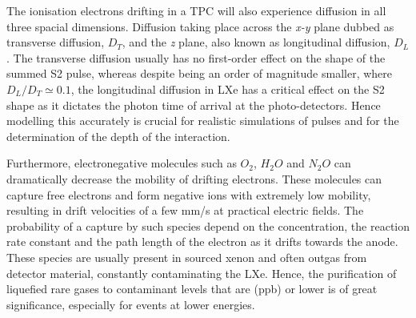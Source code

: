 The ionisation electrons drifting in a TPC will also experience diffusion in all three spacial dimensions. Diffusion taking place across the \textit{x-y} plane dubbed as transverse diffusion, $D_{T}$, and the \textit{z} plane, also known as longitudinal diffusion, $D_{L}$. The transverse diffusion usually has no first-order effect on the shape of the summed S2 pulse, whereas despite being an order of magnitude smaller, where $D_{L}/D_{T} \simeq 0.1$, the longitudinal diffusion in LXe has a critical effect on the S2 shape as it dictates the photon time of arrival at the photo-detectors. Hence modelling this accurately is crucial for realistic simulations of pulses and for the determination of the depth of the interaction.

Furthermore, electronegative molecules such as $O_{2}$, $H_{2}O$ and $N_{2}O$ can dramatically decrease the mobility of drifting electrons. These molecules can capture free electrons and form negative ions with extremely low mobility, resulting in drift velocities of a few mm/s at practical electric fields. The probability of a capture by such species depend on the concentration, the reaction rate constant and the path length of the electron as it drifts towards the anode. These species are usually present in sourced xenon and often outgas from detector material, constantly contaminating the LXe. Hence, the purification of liquefied rare gases to contaminant levels that are (ppb) or lower is of great significance, especially for events at lower energies.

